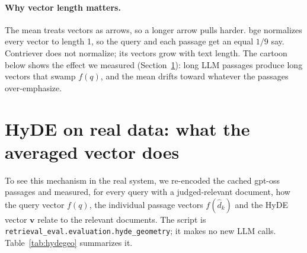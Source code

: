 \documentclass[11pt]{article}
\begin{document}
\paragraph{Why vector length matters.} The mean treats vectors as arrows, so a longer arrow pulls
harder. bge normalizes every vector to length 1, so the query and each passage get an equal
$1/9$ say. Contriever does not normalize; its vectors grow with text length. The cartoon below
shows the effect we measured (Section~\ref{sec:hydegeo}): long LLM passages produce long vectors that
swamp $f(q)$, and the mean drifts toward whatever the passages over-emphasize.
\begin{center}\end{center}

\section{HyDE on real data: what the averaged vector does}\label{sec:hydegeo}
To see this mechanism in the real system, we re-encoded the cached
gpt-oss passages and measured, for every query with a judged-relevant document, how the query vector
$f(q)$, the individual passage vectors $f(\hat d_k)$ and the HyDE vector $\mathbf v$ relate to the
relevant documents. The script is \texttt{retrieval\_eval.evaluation.hyde\_geometry}; it makes no new LLM calls.
Table~\ref{tab:hydegeo} summarizes it.
\end{document}
